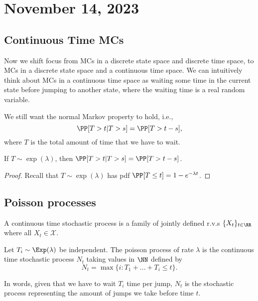 \section{November 14, 2023}

\subsection{Continuous Time MCs}

Now we shift focus from MCs in a discrete state space and discrete time space, to MCs in a discrete state space and a continuous time space. We can intuitively think about MCs in a continuous time space as waiting some time in the current state before jumping to another state, where the waiting time is a real random variable. 

We still want the normal Markov property to hold, i.e., 
\[\PP[T > t | T > s] = \PP[T > t-s],\]
where $T$ is the total amount of time that we have to wait. 

\begin{theorem}
\lemlabel

If $T\sim \exp(\lambda)$, then $\PP[T > t | T > s] = \PP[T > t-s]$. 
\end{theorem}

\begin{proof}
	Recall that $T\sim \exp(\lambda)$ has pdf $\PP[T\leq t] = 1 - e^{-\lambda t}$.
\end{proof}

\subsection{Poisson processes}

\begin{definition}

A continuous time stochastic process is a family of jointly defined r.v.s $\{X_t\}_{t\in \RR}$ where all $X_t\in \mathcal{X}$.
\end{definition}

\begin{definition}

Let $T_i\sim \Exp(\lambda)$ be independent. The \ac{poisson process} of rate $\lambda$ is the continuous time stochastic process $N_t$ taking values in $\NN$ defined by 
\[N_t = \max\{i : T_1 + \hdots + T_i\leq t\}.\] 
\end{definition}

In words, given that we have to wait $T_i$ time per jump, $N_t$ is the stochastic process representing the amount of jumps we take before time $t$. 

